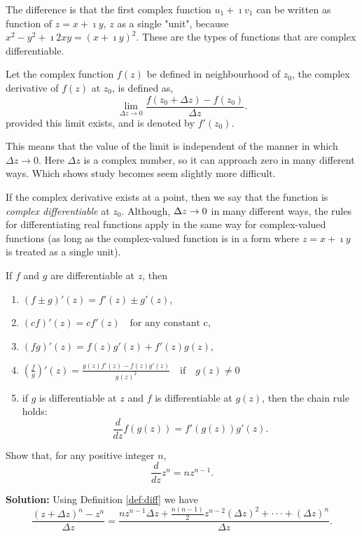 The difference is that the first complex function $u_1+\imath v_1$ can be
written as function of $z=x+\imath y$, $z$ as a single "unit", because $x^2-y^2+\imath 2xy = (x+\imath y)^2$.  These are the types of functions that are complex differentiable.
\begin{definition}
\label{def:diff}
Let the complex function $f(z)$ be defined in neighbourhood of $z_0$, the
complex derivative of  $f(z)$ at $z_0$, is defined as, 
\[  \lim_{\Delta z \to 0}\frac{f(z_{0} + \Delta z) - f(z_{0})}{\Delta z}.\]
provided this limit exists, and is denoted by $f'(z_{0})$.  
\end{definition}
This means that the 
value of the limit is independent of the manner in which $\Delta z \to 0$.  
Here $\Delta z$ is a complex number, so it can approach zero in many different ways. Which shows study becomes seem slightly more difficult.

If the complex derivative exists at a point, then we say that the function
is \textit{complex differentiable} at $z_0$.
Although,  $\Delta z \rightarrow 0$ in many different ways, the rules for differentiating real functions apply in the same way for complex-valued functions (as long as the complex-valued function is in a form where $z=x+\imath y$ is treated as a single unit).

\begin{theorem}
If $f$ and $g$ are differentiable at $z$, then 

\begin{enumerate}
\item $(f \pm g)'(z) = f'(z) \pm g'(z)$,
\item $(cf)'(z) = cf'(z) \quad\mbox{for any constant c}$,
\item $(fg)'(z) = f(z)g'(z) + f'(z)g(z)$,
\item $\left(\frac{f}{g}\right)'(z) = \frac{g(z)f'(z)-f(z)g'(z)}{g(z)^2} \quad\mbox{if}\quad g(z) \neq 0$
\item 
if $g$ is differentiable at $z$ and $f$ is differentiable at $g(z)$, then the chain rule holds: 
$$\frac{d}{dz}f(g(z))=f'(g(z))g'(z).$$
\end{enumerate}
\end{theorem}

\begin{example}
Show that, for any positive integer $n$, $$\frac{d}{dz} z^n=nz^{n-1}.$$
\end{example}

\textbf{Solution: }  Using Definition \ref{def:diff} we have
$$\frac{(z+\Delta z)^n-z^n}{\Delta z}=\frac{nz^{n-1}\Delta z+\frac{n(n-1)}{2}z^{n-2}(\Delta z)^2+\cdot\cdot\cdot+(\Delta z)^n}{\Delta z}.$$

